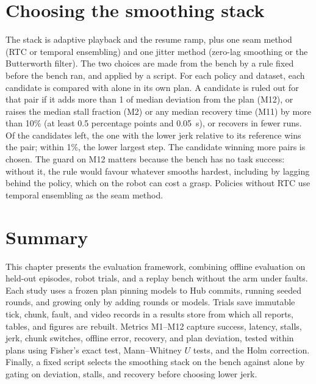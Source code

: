 \section{Choosing the smoothing stack}\label{sec:stackrule}

The stack is adaptive playback and the resume ramp, plus one seam method (RTC or temporal ensembling) and one jitter
method (zero-lag smoothing or the Butterworth filter). The two choices are made from the bench by a rule fixed before
the bench ran, and applied by a script. For each policy and dataset, each candidate is compared with \drtc{} alone in
its own plan. A candidate is ruled out for that pair if it adds more than 1\degree{} of median deviation from the plan
(M12), or raises the median stall fraction (M2) or any median recovery time (M11) by more than 10\% (at least 0.5
percentage points and 0.05~s), or recovers in fewer runs. Of the candidates left, the one with the lower jerk relative to
its reference wins the pair; within 1\%, the lower largest step. The candidate winning more pairs is chosen. The guard
on M12 matters because the bench has no task success: without it, the rule would favour whatever smooths hardest,
including by lagging behind the policy, which on the robot can cost a grasp. Policies without RTC use temporal
ensembling as the seam method.


\section{Summary}
This chapter presents the evaluation framework, combining offline evaluation on held-out episodes, robot trials, and a replay bench without the arm under faults. Each study uses a frozen plan pinning models to Hub commits, running seeded rounds, and growing only by adding rounds or models. Trials save immutable tick, chunk, fault, and video records in a results store from which all reports, tables, and figures are rebuilt. Metrics M1--M12 capture success, latency, stalls, jerk, chunk switches, offline error, recovery, and plan deviation, tested within plans using Fisher's exact test, Mann--Whitney $U$ tests, and the Holm correction. Finally, a fixed script selects the smoothing stack on the bench against \drtc{} alone by gating on deviation, stalls, and recovery before choosing lower jerk.

